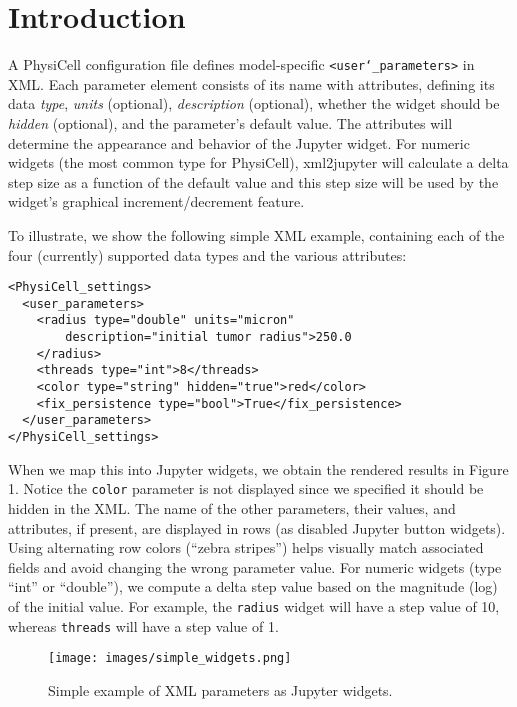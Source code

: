 \documentclass[10pt,letterpaper]{article}
\begin{document}
\section*{Introduction}
A PhysiCell configuration file defines model-specific
\texttt{\textless{}user\char`_parameters\textgreater{}} in XML. Each
parameter element consists of its name with attributes, defining its
data \emph{type}, \emph{units} (optional), \emph{description}
(optional), whether the widget should be \emph{hidden} (optional), and
the parameter's default value. The attributes will determine the
appearance and behavior of the Jupyter widget. For numeric widgets (the
most common type for PhysiCell), xml2jupyter will calculate a delta step
size as a function of the default value and this step size will be used
by the widget's graphical increment/decrement feature.

To illustrate, we show the following simple XML example, containing each
of the four (currently) supported data types and the various attributes:

\begin{verbatim}
<PhysiCell_settings>
  <user_parameters>
    <radius type="double" units="micron"
        description="initial tumor radius">250.0
    </radius>
    <threads type="int">8</threads>
    <color type="string" hidden="true">red</color>
    <fix_persistence type="bool">True</fix_persistence>
  </user_parameters>
</PhysiCell_settings>
\end{verbatim}

When we map this into Jupyter widgets, we obtain the rendered results in
Figure 1. Notice the \texttt{color} parameter is not displayed since we
specified it should be hidden in the XML. The name of the other
parameters, their values, and attributes, if present, are displayed in
rows (as disabled Jupyter button widgets). Using alternating row colors
(``zebra stripes'') helps visually match associated fields and avoid
changing the wrong parameter value. For numeric widgets (type ``int'' or
``double''), we compute a delta step value based on the magnitude (log)
of the initial value. For example, the \texttt{radius} widget will have
a step value of 10, whereas \texttt{threads} will have a step value of
1.

\begin{figure}[H]
\centering
\texttt{[image: images/simple\_widgets.png]}
\caption{Simple example of XML parameters as Jupyter widgets.}
\end{figure}
\end{document}
